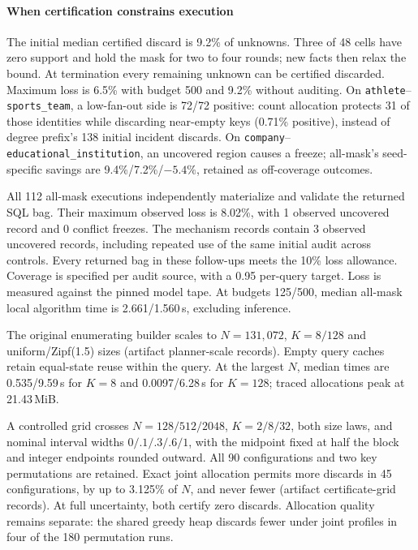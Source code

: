 \paragraph*{When certification constrains execution}
The initial median certified discard is 9.2\% of unknowns. Three of
48 cells have zero support and hold the mask for two to four rounds;
new facts then relax the bound. At termination every remaining unknown
can be certified discarded. Maximum loss is 6.5\% with budget 500 and
9.2\% without auditing.
On \texttt{athlete}--\texttt{sports\_team}, a low-fan-out side is
72/72 positive: count allocation protects 31 of those identities while
discarding near-empty keys (0.71\% positive), instead of degree prefix's
138 initial incident discards. On
\texttt{company}--\texttt{educational\_institution}, an uncovered region
causes a freeze; all-mask's seed-specific savings are
9.4\%/7.2\%/$-5.4\%$, retained as off-coverage outcomes.





All 112 all-mask executions independently materialize and validate the returned SQL bag. Their maximum observed loss is 8.02\%, with 1 observed uncovered record and 0 conflict freezes. The mechanism records contain 3 observed uncovered records, including repeated use of the same initial audit across controls. Every returned bag in these follow-ups meets the 10\% loss allowance. Coverage is specified per audit source, with a 0.95 per-query target. Loss is measured against the pinned model tape. At budgets 125/500, median all-mask local algorithm time is 2.661/1.560\,s, excluding inference.



The original enumerating builder scales to $N=131{,}072$, $K=8/128$
and uniform/Zipf(1.5) sizes (artifact planner-scale records).
Empty query caches retain equal-state reuse within the query. At the
largest $N$, median times are 0.535/9.59\,s for $K=8$ and
0.0097/6.28\,s for $K=128$; traced allocations peak at 21.43\,MiB.



A controlled grid crosses $N=128/512/2048$, $K=2/8/32$, both size laws,
and nominal interval widths $0/.1/.3/.6/1$, with the midpoint fixed at
half the block and integer endpoints rounded outward. All 90
configurations and two key permutations are retained. Exact joint
allocation permits more discards in 45 configurations, by up to
3.125\% of $N$, and never fewer (artifact certificate-grid records).
At full uncertainty, both certify zero discards. Allocation quality
remains separate: the shared greedy heap discards fewer under joint
profiles in four of the 180 permutation runs.

